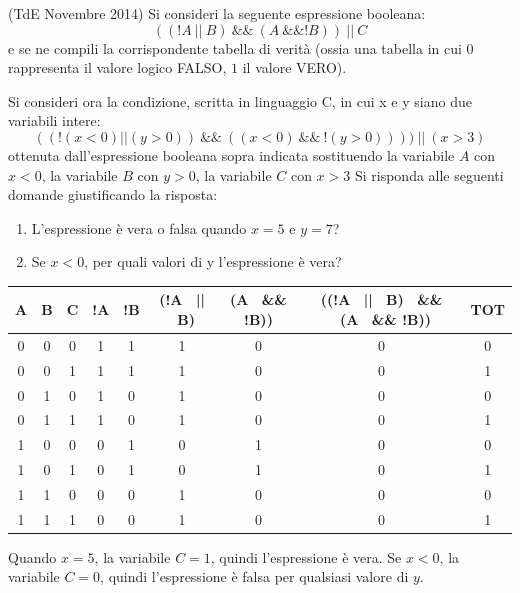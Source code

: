 \begin{Exercise}[label={ex:espr_logica}]
(TdE Novembre 2014) Si consideri la seguente espressione booleana:
$$((!A \ || \ B) \ \&\& \ (A \  \&\& !B))\ || \ C$$
e se ne compili la corrispondente tabella di verit\`a (ossia una tabella in cui $0$ rappresenta il valore logico FALSO, $1$ il valore VERO).

Si consideri ora la condizione, scritta in linguaggio C, in cui x e y siano due variabili intere:
$$((!(x < 0) || (y>0)) \ \&\& \ ((x < 0) \ \&\& \ !(y > 0))) ) \ || \ (x > 3)$$
ottenuta dall'espressione booleana sopra indicata sostituendo la variabile $A$ con $x < 0$, la variabile $B$ con $y > 0$, la variabile $C$ con $x > 3$
Si risponda alle seguenti domande giustificando la risposta:
\begin{enumerate}
	\item L'espressione \`e vera o falsa quando $x = 5$ e $y = 7$?
	\item Se $x < 0$, per quali valori di y l'espressione \`e vera?
\end{enumerate}
\end{Exercise}

\begin{Answer}[ref={ex:espr_logica}]
\begin{tabular}{|c|c|c|c|c|c|c|c|c|}
\hline
A & B & C & !A & !B & (!A \ || \ B) & (A \  \&\& !B)) & ((!A \ || \ B) \ \&\& \ (A \  \&\& !B)) & TOT\\
\hline
0 & 0 & 0 & 1 & 1 & 1 & 0 & 0 & 0\\
\hline
0 & 0 & 1 & 1 & 1 & 1 & 0 & 0 & 1\\
\hline
0 & 1 & 0 & 1 & 0 & 1 & 0 & 0 & 0\\
\hline
0 & 1 & 1 & 1 & 0 & 1 & 0 & 0 & 1\\
\hline
1 & 0 & 0 & 0 & 1 & 0 & 1 & 0 & 0\\
\hline
1 & 0 & 1 & 0 & 1 & 0 & 1 & 0 & 1\\
\hline
1 & 1 & 0 & 0 & 0 & 1 & 0 & 0 & 0\\
\hline
1 & 1 & 1 & 0 & 0 & 1 & 0 & 0 & 1\\
\hline
\end{tabular}

Quando $x = 5$, la variabile $C = 1$, quindi l'espressione \`e vera. Se $x < 0$, la variabile $C = 0$, quindi l'espressione \`e falsa per qualsiasi valore di $y$.
\end{Answer}